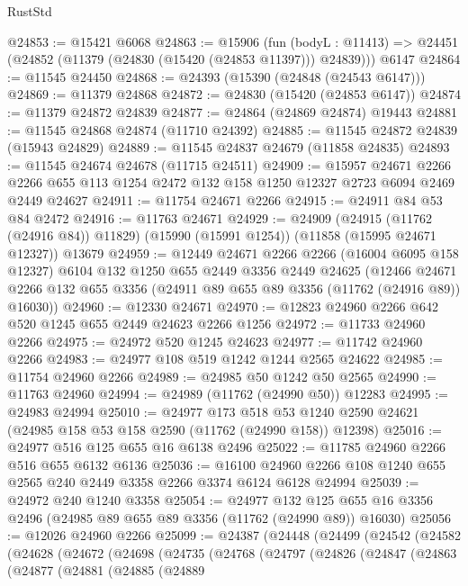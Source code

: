 \begin{lexlean}{RustStd}
\begin{coremodule}
@24853 := @15421 @6068
@24863 := @15906
    (fun (bodyL : @11413) => @24451 (@24852 (@11379 (@24830 (@15420 (@24853 @11397))) @24839)))
    @6147
@24864 := @11545 @24450
@24868 := @24393 (@15390 (@24848 (@24543 @6147)))
@24869 := @11379 @24868
@24872 := @24830 (@15420 (@24853 @6147))
@24874 := @11379 @24872 @24839
@24877 := @24864 (@24869 @24874) @19443
@24881 := @11545 @24868 @24874 (@11710 @24392)
@24885 := @11545 @24872 @24839 (@15943 @24829)
@24889 := @11545 @24837 @24679 (@11858 @24835)
@24893 := @11545 @24674 @24678 (@11715 @24511)
@24909 := @15957
    @24671
    @2266
    @2266
    @655
    @113
    @1254
    @2472
    @132
    @158
    @1250
    @12327
    @2723
    @6094
    @2469
    @2449
    @24627
@24911 := @11754 @24671 @2266
@24915 := @24911 @84 @53 @84 @2472
@24916 := @11763 @24671
@24929 := @24909
    (@24915 (@11762 (@24916 @84)) @11829)
    (@15990 (@15991 @1254))
    (@11858 (@15995 @24671 @12327))
    @13679
@24959 := @12449
    @24671
    @2266
    @2266
    (@16004 @6095 @158 @12327)
    @6104
    @132
    @1250
    @655
    @2449
    @3356
    @2449
    @24625
    (@12466 @24671 @2266 @132 @655 @3356 (@24911 @89 @655 @89 @3356 (@11762 (@24916 @89)) @16030))
@24960 := @12330 @24671
@24970 := @12823 @24960 @2266 @642 @520 @1245 @655 @2449 @24623 @2266 @1256
@24972 := @11733 @24960 @2266
@24975 := @24972 @520 @1245 @24623
@24977 := @11742 @24960 @2266
@24983 := @24977 @108 @519 @1242 @1244 @2565 @24622
@24985 := @11754 @24960 @2266
@24989 := @24985 @50 @1242 @50 @2565
@24990 := @11763 @24960
@24994 := @24989 (@11762 (@24990 @50)) @12283
@24995 := @24983 @24994
@25010 := @24977
    @173
    @518
    @53
    @1240
    @2590
    @24621
    (@24985 @158 @53 @158 @2590 (@11762 (@24990 @158)) @12398)
@25016 := @24977 @516 @125 @655 @16 @6138 @2496
@25022 := @11785 @24960 @2266 @516 @655 @6132 @6136
@25036 := @16100 @24960 @2266 @108 @1240 @655 @2565 @240 @2449 @3358 @2266 @3374 @6124 @6128 @24994
@25039 := @24972 @240 @1240 @3358
@25054 := @24977
    @132
    @125
    @655
    @16
    @3356
    @2496
    (@24985 @89 @655 @89 @3356 (@11762 (@24990 @89)) @16030)
@25056 := @12026 @24960 @2266
@25099 := @24387
    (@24448
      (@24499
        (@24542
          (@24582
            (@24628
              (@24672
                (@24698
                  (@24735
                    (@24768
                      (@24797
                        (@24826
                          (@24847
                            (@24863
                              (@24877
                                (@24881
                                  (@24885
                                    (@24889

\end{coremodule}
\end{lexlean}
